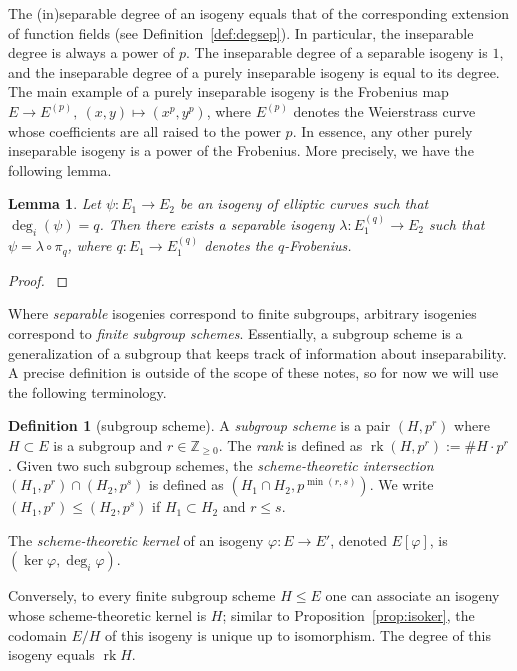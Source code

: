\documentclass[10pt]{article}
\theoremstyle{plain}
\newtheorem{lemma}[theorem]{Lemma}
\theoremstyle{definition}
\newtheorem{definition}[theorem]{Definition}
\DeclareMathOperator{\rk}{rk} %
\def\Z{\ensuremath{\mathbb{Z}}}
\begin{document}
The (in)separable degree of an isogeny equals that of 
the corresponding extension of function fields
(see Definition~\ref{def:degsep}).
In particular, the inseparable degree is always a power of $p$.
The inseparable degree of a separable isogeny is $1$,
and the inseparable degree of a purely inseparable isogeny is equal
to its degree.
The main example of a purely inseparable isogeny is the Frobenius map
$E\to E^{(p)},\:(x,y)\mapsto (x^p,y^p)$, where $E^{(p)}$ denotes the
Weierstrass curve whose coefficients are all raised to the power $p$.
In essence, any other purely inseparable isogeny is a power of the
Frobenius. More precisely, we have the following lemma.

\begin{lemma}\label{lem:insepdecomp}
    Let $\psi:E_1\to E_2$ be an isogeny of elliptic curves such that
    $\deg_i(\psi)=q$. Then there exists a separable isogeny
    $\lambda:E_1^{(q)}\to E_2$ such that $\psi = \lambda\circ\pi_q$,
    where $q:E_1 \to E_1^{(q)}$ denotes the $q$-Frobenius.
\end{lemma}
\begin{proof}
    \cite[II, Coro.~2.12]{silverman:elliptic}
\end{proof}

Where \emph{separable} isogenies correspond to finite subgroups,
arbitrary isogenies correspond to \emph{finite subgroup schemes}.
Essentially, a subgroup scheme is a generalization of a subgroup that
keeps track of information about inseparability.
A precise definition is outside of the scope of these notes, so for
now we will use the following terminology.

\begin{definition}[subgroup scheme]
A \emph{subgroup scheme} is a pair $(H,p^r)$
where $H\subset E$ is a subgroup and $r\in\Z_{\geq 0}$.
The \emph{rank} is defined as $\rk(H,p^r) := \# H \cdot p^r$.
Given two such subgroup schemes, the \emph{scheme-theoretic intersection}
$(H_1,p^r)\cap (H_2,p^s)$ is defined as $(H_1\cap H_2, p^{\min(r,s)})$.
We write $(H_1,p^r)\leq (H_2,p^s)$ if $H_1\subset H_2$ and $r\leq s$.

The \emph{scheme-theoretic kernel} of an isogeny $\varphi: E\to E'$,
denoted $E[\varphi]$, is $(\ker\varphi,\deg_i\varphi)$.
\end{definition}

Conversely, to every finite subgroup scheme $H\leq E$
one can associate an isogeny whose scheme-theoretic kernel is $H$;
similar to Proposition~\ref{prop:isoker}, the codomain $E/H$
of this isogeny is unique up to isomorphism.
The degree of this isogeny equals $\rk H$.
\end{document}
